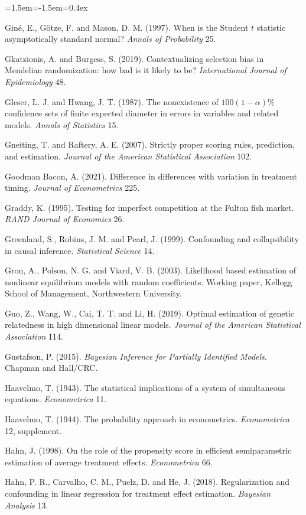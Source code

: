 \begin{list}{}{\leftmargin=1.5em\itemindent=-1.5em\itemsep=0.4ex}
\item Gin\'e, E., G\"otze, F. and Mason, D. M. (1997). When is the Student $t$ statistic asymptotically standard normal? \emph{Annals of Probability} 25.
\item Gkatzionis, A. and Burgess, S. (2019). Contextualizing selection bias in Mendelian randomization: how bad is it likely to be? \emph{International Journal of Epidemiology} 48.
\item Gleser, L. J. and Hwang, J. T. (1987). The nonexistence of $100(1-\alpha)\%$ confidence sets of finite expected diameter in errors in variables and related models. \emph{Annals of Statistics} 15.
\item Gneiting, T. and Raftery, A. E. (2007). Strictly proper scoring rules, prediction, and estimation. \emph{Journal of the American Statistical Association} 102.
\item Goodman Bacon, A. (2021). Difference in differences with variation in treatment timing. \emph{Journal of Econometrics} 225.
\item Graddy, K. (1995). Testing for imperfect competition at the Fulton fish market. \emph{RAND Journal of Economics} 26.
\item Greenland, S., Robins, J. M. and Pearl, J. (1999). Confounding and collapsibility in causal inference. \emph{Statistical Science} 14.
\item Gron, A., Polson, N. G. and Viard, V. B. (2003). Likelihood based estimation of nonlinear equilibrium models with random coefficients. Working paper, Kellogg School of Management, Northwestern University.
\item Guo, Z., Wang, W., Cai, T. T. and Li, H. (2019). Optimal estimation of genetic relatedness in high dimensional linear models. \emph{Journal of the American Statistical Association} 114.
\item Gustafson, P. (2015). \emph{Bayesian Inference for Partially Identified Models}. Chapman and Hall/CRC.
\item Haavelmo, T. (1943). The statistical implications of a system of simultaneous equations. \emph{Econometrica} 11.
\item Haavelmo, T. (1944). The probability approach in econometrics. \emph{Econometrica} 12, supplement.
\item Hahn, J. (1998). On the role of the propensity score in efficient semiparametric estimation of average treatment effects. \emph{Econometrica} 66.
\item Hahn, P. R., Carvalho, C. M., Puelz, D. and He, J. (2018). Regularization and confounding in linear regression for treatment effect estimation. \emph{Bayesian Analysis} 13.

\end{list}
